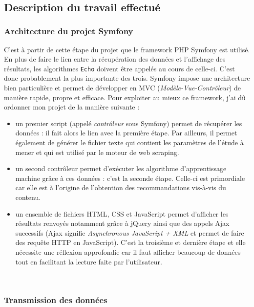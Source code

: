 \documentclass[12pt]{article}
\begin{document}
\

\subsection{Description du travail effectué}

\subsubsection{Architecture du projet Symfony}

C'est à partir de cette étape du projet que le framework \textsf{PHP} \textsf{Symfony} est utilisé. En plus de faire le lien entre la récupération des données et l'affichage des résultats, les algorithmes \texttt{Echo} doivent être appelés au cours de celle-ci. C'est donc probablement la plus importante des trois. \textsf{Symfony} impose une architecture bien particulière et permet de développer en MVC (\textit{Modèle-Vue-Contrôleur}) de manière rapide, propre et efficace. Pour exploiter au mieux ce framework, j'ai dû ordonner mon projet de la manière suivante : 
\begin{itemize}
	\item un premier script (appelé \textit{contrôleur} sous \textsf{Symfony}) permet de récupérer les données : il fait alors le lien avec la première étape. Par ailleurs, il permet également de générer le fichier texte qui contient les paramètres de l'étude à mener et qui est utilisé par le moteur de web scraping.  
	\item un second contrôleur permet d'exécuter les algorithme d'apprentissage machine grâce à ces données : c'est la seconde étape. Celle-ci est primordiale car elle est à l'origine de l'obtention des recommandations vis-à-vis du contenu.
	\item un ensemble de fichiers \textsf{HTML}, \textsf{CSS} et \textsf{JavaScript} permet d'afficher les résultats renvoyés notamment grâce à \textsf{jQuery} ainsi que des appels \textsf{Ajax} successifs (\textsf{Ajax} signifie \textit{Asynchronous JavaScript + XML}  et permet de faire des requête \textsf{HTTP} en \textsf{JavaScript}). C'est la troisième et dernière étape et elle nécessite une réflexion approfondie car il faut afficher beaucoup de données tout en facilitant la lecture faite par l'utilisateur.
\end{itemize}

\

\subsubsection{Transmission des données}
\end{document}
